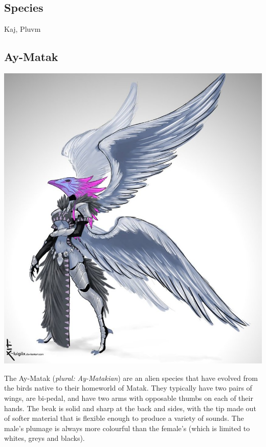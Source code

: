 \documentclass[10pt,twoside]{article}
\begin{document}
\begin{multicols}{2}

        \section{Species}

        Kaj, Pluvm

        \subsection{Ay-Matak}

        \includegraphics[width=\linewidth]{bird_race_f_concept_by_luigiix-d52w3as}

        The Ay-Matak (\textit{plural: Ay-Matakian}) are an alien species that have evolved from the birds native to their homeworld of Matak. They typically have two pairs of wings, are bi-pedal, and have two arms with opposable thumbs on each of their hands. The beak is solid and sharp at the back and sides, with the tip made out of softer material that is flexible enough to produce a variety of sounds. The male's plumage is always more colourful than the female's (which is limited to whites, greys and blacks).


\end{multicols}
\end{document}
